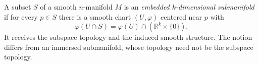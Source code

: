 
A subset $S$ of a smooth $n$-manifold $M$ is an \emph{embedded $k$-dimensional submanifold} if for every $p\in S$ there is a smooth chart $(U,\varphi)$ centered near $p$ with
\[
\varphi(U\cap S)=\varphi(U)\cap(\mathbb R^k\times\{0\}).
\]
It receives the subspace topology and the induced smooth structure. The notion differs from an immersed submanifold, whose topology need not be the subspace topology.
